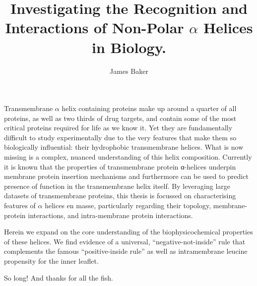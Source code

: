\documentclass[12pt,PhD,twoside]{muthesis}
\begin{document}
\title{Investigating the Recognition and Interactions of Non-Polar $\alpha$ Helices in Biology.}
\author{James Baker}
\def\wordcount{xxxxx}




\beforeabstract

Transmembrane $\alpha$ helix containing proteins make up around a quarter of all proteins, as well as two thirds of drug targets, and contain some of the most critical proteins required for life as we know it. Yet they are fundamentally difficult to study experimentally due to the very features that make them so biologically influential: their hydrophobic transmembrane helices. What is now missing is a complex, nuanced understanding of this helix composition. Currently it is known that the properties of transmembrane protein α-helices underpin membrane protein insertion mechanisms and furthermore can be used to predict presence of function in the transmembrane helix itself. By leveraging large datasets of transmembrane proteins, this thesis is focussed on characterising features of $\alpha$ helices en masse, particularly regarding their topology, membrane-protein interactions, and intra-membrane protein interactions.

Herein we expand on the core understanding of the biophysicochemical properties of these helices. We find evidence of a universal, ``negative-not-inside'' rule that complements the famous ``positive-inside rule'' as well as intramembrane leucine propensity for the inner leaflet.

\afterabstract

So long! And thanks for all the fish.

\afterpreface


\end{document}
